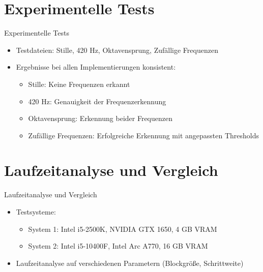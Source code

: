 \documentclass{beamer}
\begin{document}
\section{Experimentelle Tests}
\begin{frame}{Experimentelle Tests}
    \begin{itemize}
        \item Testdateien: Stille, 420 Hz, Oktavensprung, Zufällige Frequenzen
        \item Ergebnisse bei allen Implementierungen konsistent:
        \begin{itemize}
            \item Stille: Keine Frequenzen erkannt
            \item 420 Hz: Genauigkeit der Frequenzerkennung
            \item Oktavensprung: Erkennung beider Frequenzen
            \item Zufällige Frequenzen: Erfolgreiche Erkennung mit angepassten Thresholds
        \end{itemize}
    \end{itemize}
\end{frame}

\section{Laufzeitanalyse und Vergleich}
\begin{frame}{Laufzeitanalyse und Vergleich}
    \begin{itemize}
        \item Testsysteme:
        \begin{itemize}
            \item System 1: Intel i5-2500K, NVIDIA GTX 1650, 4 GB VRAM
            \item System 2: Intel i5-10400F, Intel Arc A770, 16 GB VRAM
        \end{itemize}
        \item Laufzeitanalyse auf verschiedenen Parametern (Blockgröße, Schrittweite)
    \end{itemize}
\end{frame}
\end{document}
